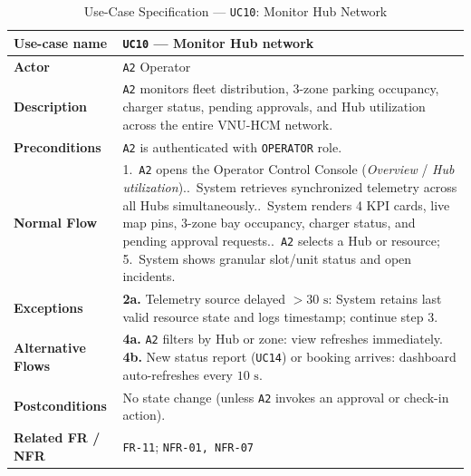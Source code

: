 \begin{table}[H]
  \centering
  \singlespacing\footnotesize
  \caption{Use-Case Specification --- \texttt{UC10}: Monitor Hub Network}
  \label{tab:uc10}
  \renewcommand{\arraystretch}{1.13}
  \begin{tabularx}{\textwidth}{|L{2.9cm}|Y|}
    \hline
    \textbf{Use-case name} & \textbf{\texttt{UC10} --- Monitor Hub network} \\
    \hline
    \textbf{Actor} & \texttt{A2} Operator \\
    \hline
    \textbf{Description} & \texttt{A2} monitors fleet distribution, 3-zone parking occupancy, charger status, pending approvals, and Hub utilization across the entire VNU-HCM network. \\
    \hline
    \textbf{Preconditions} & \texttt{A2} is authenticated with \texttt{OPERATOR} role. \\
    \hline
    \textbf{Normal Flow} & 1.\ \texttt{A2} opens the Operator Control Console (\textit{Overview} / \textit{Hub utilization})..\ System retrieves synchronized telemetry across all Hubs simultaneously..\ System renders 4 KPI cards, live map pins, 3-zone bay occupancy, charger status, and pending approval requests..\ \texttt{A2} selects a Hub or resource; 5.\ System shows granular slot/unit status and open incidents. \\
    \hline
    \textbf{Exceptions} & \textbf{2a.} Telemetry source delayed $>30\text{ s}$: System retains last valid resource state and logs timestamp; continue step 3. \\
    \hline
    \textbf{Alternative Flows} & \textbf{4a.} \texttt{A2} filters by Hub or zone: view refreshes immediately.\newline
    \textbf{4b.} New status report (\texttt{UC14}) or booking arrives: dashboard auto-refreshes every $10\text{ s}$. \\
    \hline
    \textbf{Postconditions} & No state change (unless \texttt{A2} invokes an approval or check-in action). \\
    \hline
    \textbf{Related FR / NFR} & \texttt{FR-11}; \texttt{NFR-01, NFR-07} \\
    \hline
  \end{tabularx}
\end{table}

